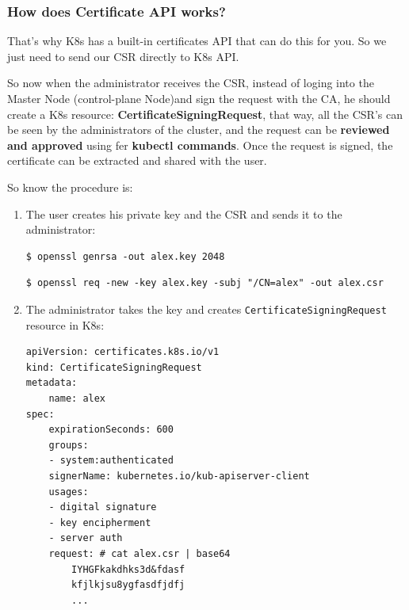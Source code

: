 \documentclass{article}
\newenvironment{codetemplate}[1][]{%
  \mybasecolorbox[#1]
  \itshape
}{%
  \endmybasecolorbox
}
\begin{document}
\subsubsection{How does Certificate API works?}

That's why K8s has a built-in certificates API that can do this for you. So we just need to send our CSR directly to K8s API.

So now when the administrator receives the CSR, instead of loging into the Master Node (control-plane Node)and sign the request with the CA, he should create a K8s resource: \textbf{CertificateSigningRequest},
that way, all the CSR's can be seen by the administrators of the cluster, and the request can be \textbf{reviewed and approved} using fer \textbf{kubectl commands}. Once the request is signed, the certificate can be extracted and shared with the user.

So know the procedure is:
\begin{enumerate}
    \item The user creates his private key and the CSR and sends it to the administrator:
\begin{codetemplate}{}
\begin{verbatim}
$ openssl genrsa -out alex.key 2048
\end{verbatim}
\end{codetemplate}
\begin{codetemplate}{}
\begin{verbatim}
$ openssl req -new -key alex.key -subj "/CN=alex" -out alex.csr
\end{verbatim}
\end{codetemplate}

    \item The administrator takes the key and creates \verb|CertificateSigningRequest| resource in K8s:
\begin{codetemplate}{}
\begin{verbatim}
apiVersion: certificates.k8s.io/v1
kind: CertificateSigningRequest
metadata:
    name: alex
spec:
    expirationSeconds: 600
    groups:
    - system:authenticated
    signerName: kubernetes.io/kub-apiserver-client
    usages:
    - digital signature
    - key encipherment
    - server auth
    request: # cat alex.csr | base64
        IYHGFkakdhks3d&fdasf
        kfjlkjsu8ygfasdfjdfj
        ...
\end{verbatim}
\end{codetemplate}
\end{enumerate}
\end{document}
